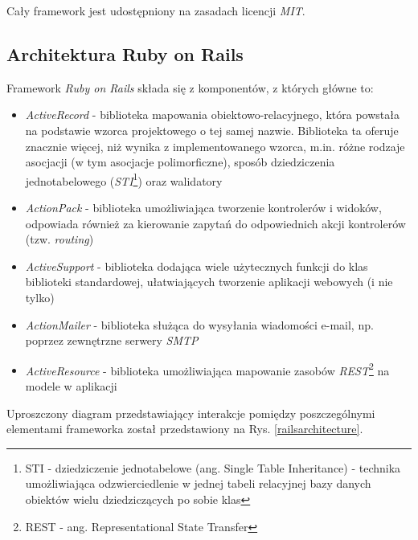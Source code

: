 \documentclass[11pt,twoside]{report}
\providecommand{\imref}[1]{Rys. \ref{#1}} %
\begin{document}
Cały framework jest udostępniony na zasadach licencji
\emph{MIT}\cite{mit}.

\subsection{Architektura Ruby on Rails}
Framework \emph{Ruby on Rails} składa się z komponentów, z których
główne to:

\begin{itemize}
\item \emph{ActiveRecord} - biblioteka mapowania
  obiektowo-relacyjnego, która powstała na podstawie wzorca
  projektowego o tej samej nazwie. Biblioteka ta oferuje znacznie
  więcej, niż wynika z implementowanego wzorca, m.in. różne rodzaje
  asocjacji (w tym asocjacje polimorficzne), sposób dziedziczenia
  jednotabelowego (\emph{STI}\footnote{STI - dziedziczenie
    jednotabelowe (ang. Single Table Inheritance) - technika
    umożliwiająca odzwierciedlenie w jednej tabeli relacyjnej bazy
    danych obiektów wielu dziedziczących po sobie klas}) oraz
  walidatory
\item \emph{ActionPack} - biblioteka umożliwiająca tworzenie
  kontrolerów i widoków, odpowiada również za kierowanie zapytań do
  odpowiednich akcji kontrolerów (tzw. \emph{routing})
\item \emph{ActiveSupport} - biblioteka dodająca wiele użytecznych
  funkcji do klas biblioteki standardowej, ułatwiających tworzenie
  aplikacji webowych (i nie tylko)
\item \emph{ActionMailer} - biblioteka służąca do wysyłania wiadomości
  e-mail, np. poprzez zewnętrzne serwery \emph{SMTP}
\item \emph{ActiveResource} - biblioteka umożliwiająca mapowanie
  zasobów \emph{REST}\footnote{REST - ang. Representational State
    Transfer} na modele w aplikacji
\end{itemize}

Uproszczony diagram przedstawiający interakcje pomiędzy poszczególnymi
elementami frameworka został przedstawiony na
\imref{railsarchitecture}.
\end{document}
